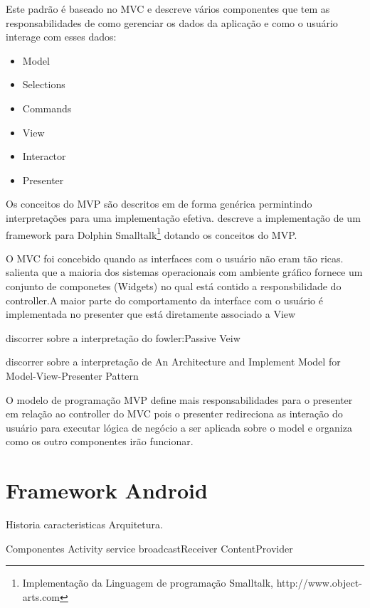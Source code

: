 Este padrão é baseado no MVC e descreve vários componentes que tem as
responsabilidades de como gerenciar os dados da aplicação e como o usuário
interage com esses dados:

\begin{itemize}
  \item Model
  \item Selections
  \item Commands
  \item View 
  \item Interactor
  \item Presenter
\end{itemize}


Os conceitos do MVP são descritos em  de forma genérica
permintindo interpretações para uma implementação efetiva.
 descreve a implementação de um framework para
Dolphin Smalltalk\footnote{Implementação da Linguagem de programação Smalltalk, http://www.object-arts.com} dotando os conceitos do MVP.

O MVC foi concebido quando as interfaces com o usuário não eram tão ricas.
 salienta que a maioria dos sistemas operacionais
com ambiente gráfico fornece um conjunto de componetes (Widgets) no qual
está contido a responsbilidade do controller.A maior parte do comportamento da
interface com o usuário é implementada no presenter que está diretamente
associado a View

discorrer sobre a interpretação do fowler:Passive Veiw

discorrer sobre a interpretação de An Architecture and Implement Model for
Model-View-Presenter Pattern


O modelo de programação MVP define mais responsabilidades para o presenter em
relação ao controller do MVC pois o presenter redireciona as interação do
usuário para executar lógica de negócio a ser aplicada sobre o model e organiza
como os outro componentes irão funcionar.


\section{Framework Android}
 
Historia caracteristicas
Arquitetura.

Componentes
	Activity
	service
	broadcastReceiver
	ContentProvider



